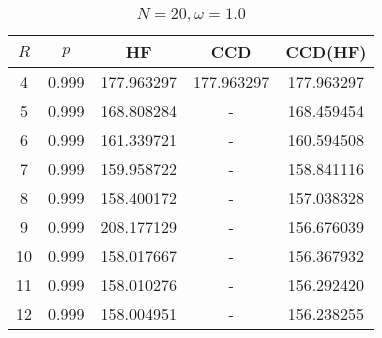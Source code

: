 \begin{table}[H]
    \centering
    \caption{$N = 20, \omega = 1.0$}
    \begin{tabular}{ccccc}
    \toprule
    $R$ & $p$ & HF & CCD & CCD(HF) \\
    \midrule
    4 & 0.999 & 177.963297 & 177.963297 & 177.963297 \\
    5 & 0.999 & 168.808284 & - & 168.459454 \\
    6 & 0.999 & 161.339721 & - & 160.594508 \\
    7 & 0.999 & 159.958722 & - & 158.841116 \\
    8 & 0.999 & 158.400172 & - & 157.038328 \\
    9 & 0.999 & 208.177129 & - & 156.676039 \\
    10 & 0.999 & 158.017667 & - & 156.367932 \\
    11 & 0.999 & 158.010276 & - & 156.292420 \\
    12 & 0.999 & 158.004951 & - & 156.238255 \\
    \bottomrule
    \end{tabular}
\end{table}
    